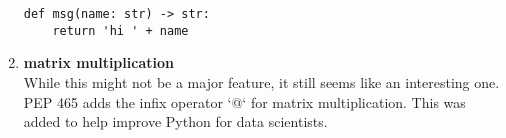 \documentclass[9pt]{extarticle} %
\begin{document}
\begin{minipage}[t]{.30\linewidth}
\begin{mdframed}[style=sidebar,frametitle={}]
\begin{enumerate}[leftmargin=0cm,itemindent=.5cm]
\begin{lstlisting}
def msg(name: str) -> str:
    return 'hi ' + name
\end{lstlisting}

\item \textbf{matrix multiplication} \\
While this might not be a major feature, it still seems like an interesting
one. PEP 465 adds the infix operator `@` for matrix multiplication. 
This was added to help improve Python for data scientists. 
\end{enumerate}





\end{mdframed}
\end{minipage}\hfill %
%
%
\end{document}
